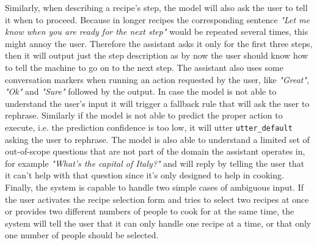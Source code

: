 \documentclass[journal, 11pt]{IEEEtran}
\begin{document}
Similarly, when describing a recipe's step, the model will also ask the user to tell it when to proceed. Because in longer recipes the corresponding sentence \textit{"Let me know when you are ready for the next step"} would be repeated several times, this might annoy the user. Therefore the assistant asks it only for the first three steps, then it will output just the step description as by now the user should know how to tell the machine to go on to the next step.
The assistant also uses some conversation markers when running an action requested by the user, like \textit{"Great"}, \textit{"Ok"} and \textit{"Sure"} followed by the output.
In case the model is not able to understand the user's input it will trigger a fallback rule that will ask the user to rephrase.
Similarly if the model is not able to predict the proper action to execute, i.e. the prediction confidence is too low, it will utter \texttt{utter\_default} asking the user to rephrase.
The model is also able to understand a limited set of out-of-scope questions that are not part of the domain the assistant operates in, for example \textit{"What's the capital of Italy?"} and will reply by telling the user that it can't help with that question since it's only designed to help in cooking.
Finally, the system is capable to handle two simple cases of ambiguous input. If the user activates the recipe selection form and tries to select two recipes at once or provides two different numbers of people to cook for at the same time, the system will tell the user that it can only handle one recipe at a time, or that only one number of people should be selected.
\end{document}
